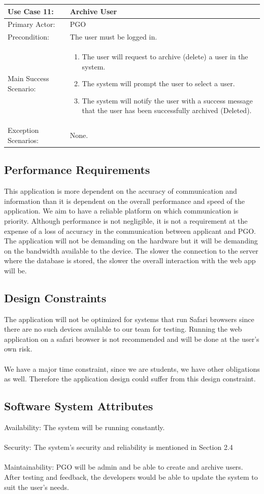 \documentclass{article}
\begin{document}
\begin{tabular}{| m{5cm} | m{10cm} |}
\hline
Use Case 11: & Archive User \\
\hline
Primary Actor: & PGO \\
\hline
Precondition: & The user must be logged in. \\
\hline
Main Success Scenario: & \begin{enumerate} \itemsep0em \item The user will request to archive (delete) a user in the system. 
\item The system will prompt the user to select a user.
\item The system will notify the user with a success message that the user has been successfully archived (Deleted).
\end{enumerate} \\
\hline
Exception Scenarios: & None. \\
\hline
\end{tabular}

\subsection{Performance Requirements}
This application is more dependent on the accuracy of communication and information than it is dependent on the overall performance and speed of the application. We aim to have a reliable platform on which communication is priority. Although performance is not negligible, it is not a requirement at the expense of a loss of accuracy in the communication between applicant and PGO. The application will not be demanding on the hardware but it will be demanding on the bandwidth available to the device. The slower the connection to the server where the database is stored, the slower the overall interaction with the web app will be.

\subsection{Design Constraints}
The application will not be optimized for systems that run Safari browsers since there are no such devices available to our team for testing. Running the web application on a safari browser is not recommended and will be done at the user's own risk. \\ \\
We have a major time constraint, since we are students, we have other obligations as well. Therefore the application design could suffer from this design constraint.

\subsection{Software System Attributes}
Availability: The system will be running constantly.  \\ \\
Security: The system's security and reliability is mentioned in Section 2.4 \\ \\ 
Maintainability: PGO will be admin and be able to create and archive users. \\
After testing and feedback, the developers would be able to update the system to suit the user's needs.
\end{document}
